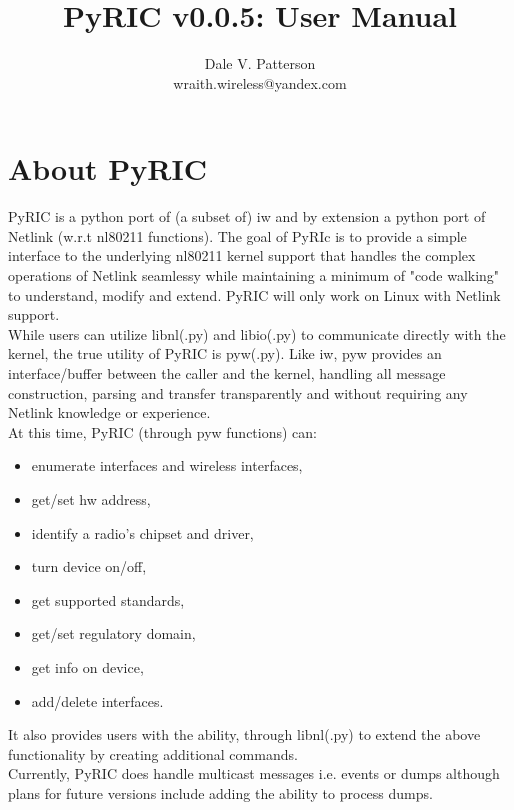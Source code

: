 \documentclass[11pt]{article}
\title{PyRIC v0.0.5: User Manual}
\author{Dale V. Patterson\\ wraith.wireless@yandex.com}
\begin{document}
\maketitle
\tableofcontents

\section{About PyRIC}\label{sec:About}
PyRIC is a python port of (a subset of) iw and by extension a python port of 
Netlink\cite{spae} (w.r.t nl80211 functions). The goal of PyRIc is to provide 
a simple interface to the underlying nl80211 kernel support that handles the 
complex operations of Netlink seamlessy while maintaining a minimum of "code 
walking" to understand, modify and extend. PyRIC will only work on Linux 
with Netlink support.\\

While users can utilize libnl(.py) and libio(.py) to communicate directly with 
the kernel, the true utility of PyRIC is pyw(.py). Like iw, pyw provides an 
interface/buffer between the caller and the kernel, handling all message
construction, parsing and transfer transparently and without requiring any 
Netlink knowledge or experience. \\

At this time, PyRIC (through pyw functions) can:
\begin{itemize}
\item enumerate interfaces and wireless interfaces,
\item get/set hw address,
\item identify a radio's chipset and driver,
\item turn device on/off,
\item get supported standards,
\item get/set regulatory domain,
\item get info on device,
\item add/delete interfaces. 
\end{itemize}
It also provides users with the ability, through libnl(.py) to extend the above 
functionality by creating additional commands.\\

Currently, PyRIC does handle multicast messages i.e. events or dumps although 
plans for future versions include adding the ability to process dumps.
\end{document}
